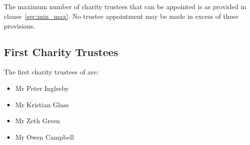         \subsection{}
        The maximum number of charity trustees that can be appointed is as provided in clause~\ref{sec:min_max}. No trustee appointment may be made in excess of these provisions.

        \subsection{First Charity Trustees}\label{sec:first_trustees}
        The first charity trustees of \shortname{} are:
        \begin{itemize}
            \item Mr Peter Inglesby
            \item Mr Kristian Glass
            \item Mr Zeth Green
            \item Mr Owen Campbell
        \end{itemize}
